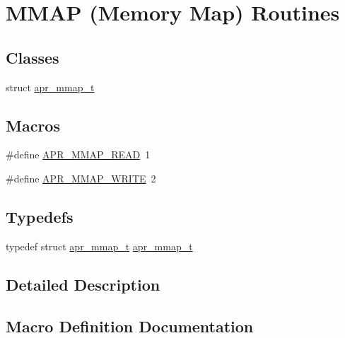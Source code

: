 \hypertarget{group__apr__mmap}{}\section{M\+M\+AP (Memory Map) Routines}
\label{group__apr__mmap}
\subsection*{Classes}
\begin{DoxyCompactItemize}
\item 
struct \mbox{\hyperlink{structapr__mmap__t}{apr\+\_\+mmap\+\_\+t}}
\end{DoxyCompactItemize}
\subsection*{Macros}
\begin{DoxyCompactItemize}
\item 
\#define \mbox{\hyperlink{group__apr__mmap_gac231fdf15d2d29802e0abbc5d0cf25b8}{A\+P\+R\+\_\+\+M\+M\+A\+P\+\_\+\+R\+E\+AD}}~1
\item 
\#define \mbox{\hyperlink{group__apr__mmap_gac2eb7f697d8bf190e630b85f967c8273}{A\+P\+R\+\_\+\+M\+M\+A\+P\+\_\+\+W\+R\+I\+TE}}~2
\end{DoxyCompactItemize}
\subsection*{Typedefs}
\begin{DoxyCompactItemize}
\item 
typedef struct \mbox{\hyperlink{structapr__mmap__t}{apr\+\_\+mmap\+\_\+t}} \mbox{\hyperlink{group__apr__mmap_ga766b01a3e1e0438d06dc88d76f826f80}{apr\+\_\+mmap\+\_\+t}}
\end{DoxyCompactItemize}


\subsection{Detailed Description}


\subsection{Macro Definition Documentation}
\mbox{\label{group__apr__mmap_gac231fdf15d2d29802e0abbc5d0cf25b8}} 
